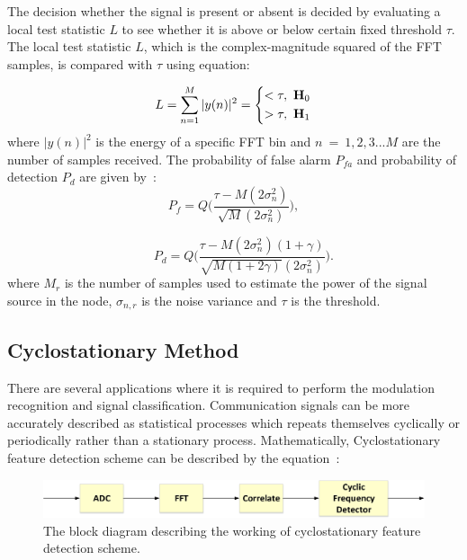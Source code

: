 The decision whether the signal is present or absent is decided by evaluating a local test statistic $L$ to see whether it is above or below certain fixed threshold $\tau$. 
The local test statistic $L$, which is the complex-magnitude squared of the FFT samples, is compared with $\tau$ using equation:

\begin{equation}
\label{eq:2}
	L = \sum_{n=1}^{M}{|y(n)|^2} = 
	\left\{
	\begin{aligned}
		<\tau,~\mathbf{H}_0 \\
		>\tau,~\mathbf{H}_1		
	\end{aligned}
	\right.
\end{equation}
where $|y(n)|^2$ is the energy of a specific FFT bin and $n~=~1,2,3...M$ are the number of samples received. The probability of false alarm $P_{fa}$ and probability of detection $P_d$ are given by~\cite{arhtn4}:
\begin{equation}
\label{eq:3}
P_f = Q\Bigg(\dfrac{\tau-M(2\sigma_n^2)}{\sqrt{M}(2\sigma_n^2)}\Bigg),
\end{equation}

\begin{equation}
\label{eq:4}
~~~~~~~P_d = Q\Bigg(\dfrac{\tau-M(2\sigma_n^2)(1+\gamma)}{\sqrt{M(1+2\gamma)}(2\sigma_n^2)}\Bigg).
\end{equation}
where $M_r$ is the number of samples used to estimate the power of the signal source in the node, $\sigma_{n,r}$ is the noise variance and $\tau$ is the threshold.

\subsection{Cyclostationary Method}

There are several applications where it is required to perform the modulation recognition and signal classification. Communication signals can be more accurately described as statistical processes which repeats themselves cyclically or periodically rather than a stationary process. Mathematically, Cyclostationary feature detection scheme can be described by the equation~\cite{bookhtn1}:

\begin{figure}[ht!]
	\centering
	\includegraphics[width=\textwidth,keepaspectratio]{images/Gill/figs/cyclostationary.eps}
    \caption{The block diagram describing the working of cyclostationary feature detection scheme.} 
\label{cycl}      
\end{figure}


